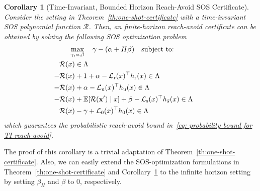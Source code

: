 \documentclass[journal,twoside,web]{ieeecolor}
\newcommand{\unsafe}{\mathrm{u}}
\newcommand{\safe}{\mathrm{s}}
\newcommand{\reach}{\mathrm{r}}
\newcommand{\initial}{\mathrm{0}}
\newcommand{\px}{\mathbf{x}}
\newcommand{\nx}{\mathbf{x}'}
\newcommand{\reals}{\mathbb{R}}
\newcommand{\RA}{\mathcal{R}}
\theoremstyle{definition}
\theoremstyle{plain}
\newtheorem{corollary}[theorem]{Corollary}
\theoremstyle{plain}
\begin{document}
\begin{corollary}[Time-Invariant, Bounded Horizon Reach-Avoid SOS Certificate]
    \label{col:one-shot-certificate-ti}
    Consider the setting in Theorem~\ref{th:one-shot-certificate} with a time-invariant SOS polynomial function $\RA$.
    Then, an finite-horizon \emph{reach-avoid certificate} can be obtained by solving the following SOS optimization problem 
    \begin{subequations}
        \label{pr:sos-2}
        \begin{align}
        & \hspace{5mm} \max_{\substack{\gamma, \alpha, \beta}}
        \quad \gamma - (\alpha + H\beta)
        \quad 
         \text{subject to:} \nonumber \\
        &\RA(x)\in \Lambda &&  \\
        - & \RA(x) + 1 + \alpha -  \mathcal{L}_{\reach}(x)^{\top}h_{\reach}(x) \in \Lambda  \\
        - & \RA(x) + \alpha - \mathcal{L}_{\unsafe}(x)^{\top}h_{\unsafe}(x) \in \Lambda   \\
        - & \RA(x) + \mathbb{E}[\RA(\px') \mid x ] +\beta  -  \mathcal{L}_{\safe}(x)^{\top}{h_{\bar s}}(x) \in \Lambda  \\
       &  \RA(x) - \gamma + \mathcal{L}_{\initial}(x)^{\top}h_{\initial}(x) \in \Lambda && 
        \end{align}
    \end{subequations}
    which guarantees the probabilistic reach-avoid bound in~\eqref{eq: probability bound for TI reach-avoid}.
\end{corollary}
The proof of this corollary is a trivial adaptation of Theorem~\ref{th:one-shot-certificate}.
Also, we can easily extend the SOS-optimization formulations in Theorem~\ref{th:one-shot-certificate} and Corollary~\ref{col:one-shot-certificate-ti} to the infinite horizon setting by setting $\beta_H$ and $\beta$ to $0$, respectively.  
\end{document}
